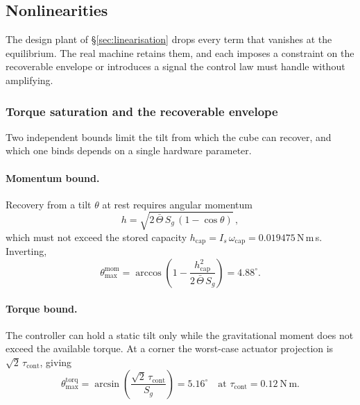 \subsection{Nonlinearities}
\label{sec:nonlinearities}

The design plant of \S\ref{sec:linearisation} drops every term that vanishes
at the equilibrium. The real machine retains them, and each imposes a
constraint on the recoverable envelope or introduces a signal the control law
must handle without amplifying.

\subsubsection{Torque saturation and the recoverable envelope}
\label{sec:saturation}

Two independent bounds limit the tilt from which the cube can recover, and
which one binds depends on a single hardware parameter.

\paragraph{Momentum bound.} Recovery from a tilt $\theta$ at rest requires
angular momentum
%
\begin{equation}
  h = \sqrt{2\,\bar\Theta\,S_g\,(1-\cos\theta)}\,,
\end{equation}
%
which must not exceed the stored capacity
$h_{\mathrm{cap}} = I_s\,\omega_{\mathrm{cap}} = 0.019475$\,N\,m\,s.
Inverting,
%
\begin{equation}
  \theta_{\max}^{\mathrm{mom}} =
  \arccos\!\left(1 - \frac{h_{\mathrm{cap}}^2}{2\,\bar\Theta\,S_g}\right)
  = 4.88^\circ .
  \label{eq:mom-bound}
\end{equation}

\paragraph{Torque bound.} The controller can hold a static tilt only while
the gravitational moment does not exceed the available torque. At a corner
the worst-case actuator projection is $\sqrt{2}\,\tau_{\mathrm{cont}}$,
giving
%
\begin{equation}
  \theta_{\max}^{\mathrm{torq}} =
  \arcsin\!\left(\frac{\sqrt{2}\,\tau_{\mathrm{cont}}}{S_g}\right)
  = 5.16^\circ \quad \text{at } \tau_{\mathrm{cont}} = 0.12\ \mathrm{N\,m}.
  \label{eq:torq-bound}
\end{equation}

